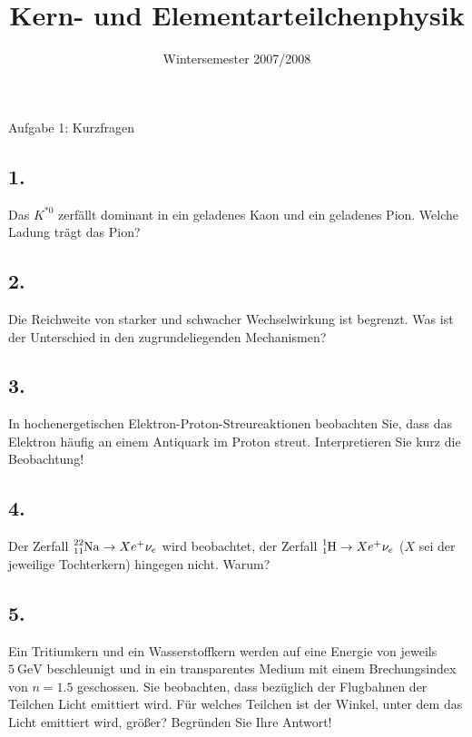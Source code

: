 

\subject{KET}
\title{Kern- und Elementarteilchenphysik}
\date{
    Wintersemester 2007/2008
}



\maketitle
\thispagestyle{empty}
\newpage


\begin{aufgabe}{Aufgabe 1: Kurzfragen}
    \subsection{1.}
    Das $K^{*0}$ zerfällt dominant in ein geladenes Kaon und ein geladenes Pion.
    Welche Ladung trägt das Pion?

    \subsection{2.}
    Die Reichweite von starker und schwacher Wechselwirkung ist begrenzt.
    Was ist der Unterschied in den zugrundeliegenden Mechanismen?

    \subsection{3.}
    In hochenergetischen Elektron-Proton-Streureaktionen beobachten Sie,
    dass das Elektron häufig an einem Antiquark im Proton streut.
    Interpretieren Sie kurz die Beobachtung!

    \subsection{4.}
    Der Zerfall $\ce{^22_11Na} \to Xe^+\nu_e$ wird beobachtet,
    der Zerfall $\ce{^1_1H} \to Xe^+\nu_e$
    ($X$ sei der jeweilige Tochterkern)
    hingegen nicht.
    Warum?

    \subsection{5.}
    Ein Tritiumkern und ein Wasserstoffkern werden auf eine Energie von jeweils $\SI{5}{\giga\electronvolt}$ beschleunigt
    und in ein transparentes Medium mit einem Brechungsindex von $n = \num{1.5}$ geschossen.
    Sie beobachten, dass bezüglich der Flugbahnen der Teilchen Licht emittiert wird.
    Für welches Teilchen ist der Winkel, unter dem das Licht emittiert wird, größer?
    Begründen Sie Ihre Antwort!


\end{aufgabe}
